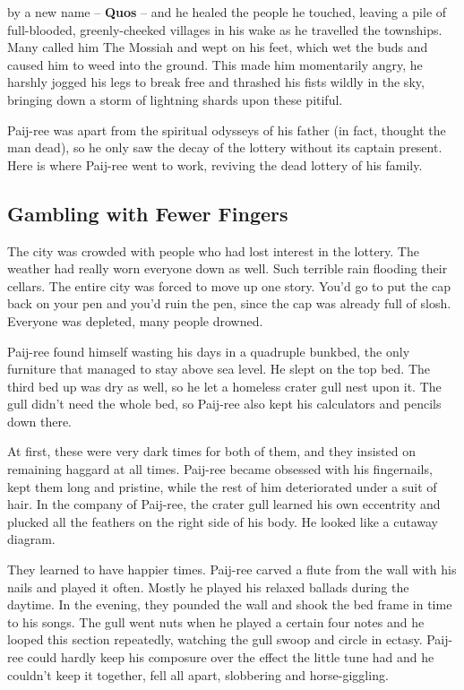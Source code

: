 \documentclass[12pt,twoside]{report}
\begin{document}
by a new name -- {\bf Quos} -- and he healed the people he touched,
leaving a pile of full-blooded, greenly-cheeked villages in his wake
as he travelled the townships.  Many called him The Mossiah and wept
on his feet, which wet the buds and caused him to weed into the
ground.  This made him momentarily angry, he harshly jogged his legs
to break free and thrashed his fists wildly in the sky, bringing down
a storm of lightning shards upon these pitiful.

Paij-ree was apart from the spiritual odysseys of his father (in fact,
thought the man dead), so he only saw the decay of the lottery without
its captain present.  Here is where Paij-ree went to work, reviving
the dead lottery of his family.



\subsection{Gambling with Fewer Fingers}



The city was crowded with people who had lost interest in the lottery.
The weather had really worn everyone down as well.  Such terrible rain
flooding their cellars. The entire city was forced to move up one
story.  You'd go to put the cap back on your pen and you'd ruin the
pen, since the cap was already full of slosh.  Everyone was depleted,
many people drowned.

Paij-ree found himself wasting his days in a quadruple bunkbed, the
only furniture that managed to stay above sea level.  He slept on the
top bed.  The third bed up was dry as well, so he let a homeless
crater gull nest upon it.  The gull didn't need the whole bed, so
Paij-ree also kept his calculators and pencils down there.

At first, these were very dark times for both of them, and they
insisted on remaining haggard at all times.  Paij-ree became obsessed
with his fingernails, kept them long and pristine, while the rest of
him deteriorated under a suit of hair.  In the company of Paij-ree,
the crater gull learned his own eccentrity and plucked all the
feathers on the right side of his body.  He looked like a cutaway
diagram.

They learned to have happier times.  Paij-ree carved a flute from the
wall with his nails and played it often.  Mostly he played his relaxed
ballads during the daytime.  In the evening, they pounded the wall and
shook the bed frame in time to his songs.  The gull went nuts when he
played a certain four notes and he looped this section repeatedly,
watching the gull swoop and circle in ectasy.  Paij-ree could hardly
keep his composure over the effect the little tune had and he couldn't
keep it together, fell all apart, slobbering and horse-giggling.
\end{document}

